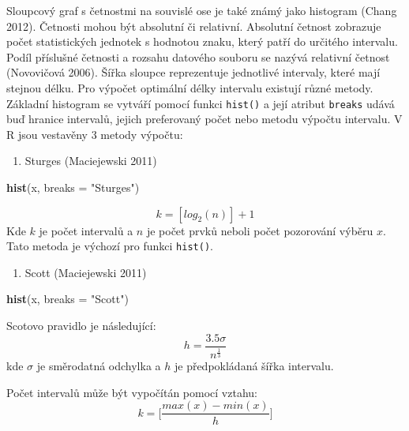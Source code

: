 \documentclass[12pt,]{article}
\newenvironment{Shaded}{\begin{snugshade}}{\end{snugshade}}
\newcommand{\KeywordTok}[1]{\textcolor[rgb]{0.13,0.29,0.53}{\textbf{#1}}}
\newcommand{\DataTypeTok}[1]{\textcolor[rgb]{0.13,0.29,0.53}{#1}}
\newcommand{\StringTok}[1]{\textcolor[rgb]{0.31,0.60,0.02}{#1}}
\newcommand{\NormalTok}[1]{#1}
\providecommand{\tightlist}{%
  \setlength{\itemsep}{0pt}\setlength{\parskip}{0pt}}
\begin{document}
\qquad Sloupcový graf s četnostmi na souvislé ose je také známý jako
histogram (Chang 2012). Četnosti mohou být absolutní či relativní.
Absolutní četnost zobrazuje počet statistických jednotek s hodnotou
znaku, který patří do určitého intervalu. Podíl příslušné četnosti a
rozsahu datového souboru se nazývá relativní četnost (Novovičová 2006).
Šířka sloupce reprezentuje jednotlivé intervaly, které mají stejnou
délku. Pro výpočet optimální délky intervalu existují různé metody.
Základní histogram se vytváří pomocí funkci \texttt{hist()} a její
atribut \texttt{breaks} udává buď hranice intervalů, jejich preferovaný
počet nebo metodu výpočtu intervalu. V R jsou vestavěny 3 metody
výpočtu:

\newpage

\begin{enumerate}
\def\labelenumi{\arabic{enumi}.}
\tightlist
\item
  Sturges (Maciejewski 2011)
\end{enumerate}

\begin{Shaded}
\begin{Highlighting}[]
\KeywordTok{hist}\NormalTok{(x, }\DataTypeTok{breaks =} \StringTok{"Sturges"}\NormalTok{)}
\end{Highlighting}
\end{Shaded}

\[k=[log_2(n)]+1\] Kde \(k\) je počet intervalů a \(n\) je počet prvků
neboli počet pozorování výběru \(x\). Tato metoda je výchozí pro funkci
\texttt{hist()}.

\begin{enumerate}
\def\labelenumi{\arabic{enumi}.}
\setcounter{enumi}{1}
\tightlist
\item
  Scott (Maciejewski 2011)
\end{enumerate}

\begin{Shaded}
\begin{Highlighting}[]
\KeywordTok{hist}\NormalTok{(x, }\DataTypeTok{breaks =} \StringTok{"Scott"}\NormalTok{)}
\end{Highlighting}
\end{Shaded}

Scotovo pravidlo je následující:
\[h=\frac{3.5 \sigma}{n^{\frac{1}{3}}}\] kde \(\sigma\) je směrodatná
odchylka a \(h\) je předpokládaná šířka intervalu.

Počet intervalů může být vypočítán pomocí vztahu:
\[k=\Big[\frac{max(x)-min(x)}{h}\Big]\]
\end{document}
